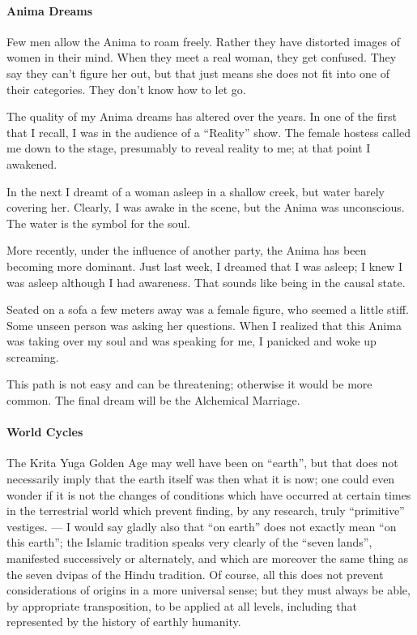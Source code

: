 \paragraph{Anima Dreams}

Few men allow the Anima to roam freely. Rather they have distorted images of women in their mind. When they meet a real woman, they get confused. They say they can't figure her out, but that just means she does not fit into one of their categories. They don't know how to let go.

The quality of my Anima dreams has altered over the years. In one of the first that I recall, I was in the audience of a ``Reality'' show. The female hostess called me down to the stage, presumably to reveal reality to me; at that point I awakened.

In the next I dreamt of a woman asleep in a shallow creek, but water barely covering her. Clearly, I was awake in the scene, but the Anima was unconscious. The water is the symbol for the soul.

More recently, under the influence of another party, the Anima has been becoming more dominant. Just last week, I dreamed that I was asleep; I knew I was asleep although I had awareness. That sounds like being in the causal state.

Seated on a sofa a few meters away was a female figure, who seemed a little stiff. Some unseen person was asking her questions. When I realized that this Anima was taking over my soul and was speaking for me, I panicked and woke up screaming.

This path is not easy and can be threatening; otherwise it would be more common. The final dream will be the Alchemical Marriage.

\paragraph{World Cycles}


\begin{quotex}
The Krita Yuga Golden Age may well have been on ``earth'', but that does not necessarily imply that the earth itself was then what it is now; one could even wonder if it is not the changes of conditions which have occurred at certain times in the terrestrial world which prevent finding, by any research, truly ``primitive'' vestiges. --- I would say gladly also that ``on earth'' does not exactly mean ``on this earth''; the Islamic tradition speaks very clearly of the ``seven lands'', manifested successively or alternately, and which are moreover the same thing as the seven dvipas of the Hindu tradition. Of course, all this does not prevent considerations of origins in a more universal sense; but they must always be able, by appropriate transposition, to be applied at all levels, including that represented by the history of earthly humanity.
\end{quotex}


